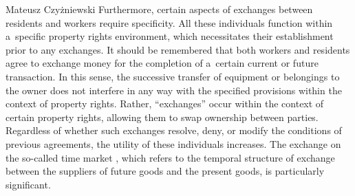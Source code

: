 \begin{newrevengenv}{Mateusz Czyżniewski}
Furthermore, certain aspects of exchanges between residents and workers require specificity. All these individuals function within a~specific property rights environment, which necessitates their establishment prior to any exchanges. It should be remembered that both workers and residents agree to exchange money for the completion of a~certain current or future transaction. In this sense, the successive transfer of equipment or belongings to the owner does not interfere in any way with the specified provisions within the context of property rights. Rather, ``exchanges'' occur within the context of certain property rights, allowing them to swap ownership between parties. Regardless of whether such exchanges resolve, deny, or modify the conditions of previous agreements, the utility of these individuals increases. The exchange on the so-called time market 
\parencite[][pp.390–410]{rothbard_man_2009}, %
 which refers to the temporal structure of exchange between the suppliers of future goods and the present goods, is particularly significant.




\end{newrevengenv}
